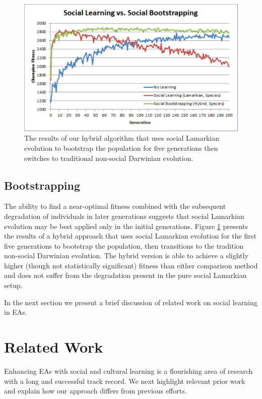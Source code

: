 \documentclass{acm_proc_article-sp}
\begin{document}
\begin{figure}
  \centering
    \includegraphics[scale=.35]{learning_bootstrapping.pdf}
  \caption{The results of our hybrid algorithm that uses social Lamarkian evolution to bootstrap the population for five generations then switches to traditional non-social Darwinian evolution.}
  \label{fig:learning-bootstrapping}
\end{figure}

\subsection*{Bootstrapping}
The ability to find a near-optimal fitness combined with the subsequent degradation of individuals in later generations suggests that social Lamarkian evolution may be best applied only in the initial generations. Figure \ref{fig:learning-bootstrapping} presents the results of a hybrid approach that uses social Lamarkian evolution for the first five generations to bootstrap the population, then transitions to the tradition non-social Darwinian evolution. The hybrid version is able to achieve a slightly higher (though not statistically significant) fitness than either comparison method and does not suffer from the degradation present in the pure social Lamarkian setup.

In the next section we present a brief discussion of related work on social learning in EAs.
 
\section{Related Work}
\label{sec:related}
Enhancing EAs with social and cultural learning is a flourishing area of research with a long and successful track record.
We next highlight relevant prior work and explain how our approach differs from previous efforts.
\end{document}
